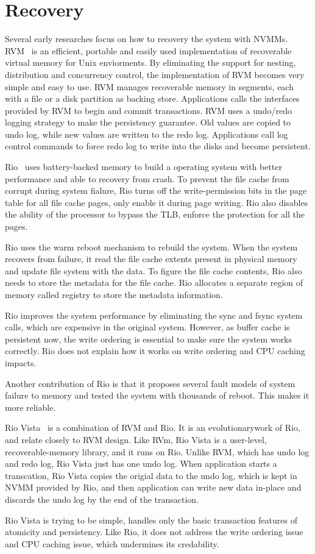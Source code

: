 \section{Recovery} 
\label{sec:recovery}

Several early researches focus on how to recovery the system with NVMMs.
RVM~\cite{RVM} is an efficient, portable and easily used implementation of
recoverable virtual memory for Unix enviorments. By eliminating the support
for nesting, distribution and concurrency control, the implementation of 
RVM becomes very simple and easy to use. RVM manages recoverable memory in
segments, each with a file or a disk partition as backing store. Applications
calls the interfaces provided by RVM to begin and commit transactions. RVM
uses a undo/redo logging strategy to make the persistency guarantee. Old values
are copied to undo log, while new values are written to the redo log. Applications call log control commands to force redo log to write into the disks
and become persistent.

Rio~\cite{riofilecache} uses battery-backed memory to build a operating system
with better performance and able to recovery from crash. To prevent the file
cache from corrupt during system fialure, Rio turns off the write-permission
bits in the page table for all file cache pages, only enable it during page
writing. Rio also disables the ability of the processor to bypass the TLB,
enforce the protection for all the pages.

Rio uses the warm reboot mechanism to rebuild the system. When the system 
recovers from failure, it read the file cache extents present in physical memory
and update file system with the data. To figure the file cache contents,
Rio also needs to store the metadata for the file cache. Rio allocates a
separate region of memory called registry to store the metadata information.

Rio improves the system performance by eliminating the sync and fsync system
calls, which are expensive in the original system. However, as buffer cache
is persistent now, the write ordering is essential to make sure the system
works correctly. Rio does not explain how it works on write ordering and CPU
caching impacts.

Another contribution of Rio is that it proposes several fault models of system
failure to memory and tested the system with thousands of reboot. This makes
it more reliable.
 
Rio Vista~\cite{riovista} is a combination of RVM and Rio. It is an evolutionarywork of Rio, and relate closely to RVM design. Like RVm, Rio Vista is a
user-level, recoverable-memory library, and it runs on Rio. Unlike RVM,
which has undo log and redo log, Rio Vista just has one undo log. When
application starts a transcation, Rio Vista copies the origial data to the 
undo log, which is kept in NVMM provided by Rio, and then application can
write new data in-place and discards the undo log by the end of the transaction.

Rio Vista is trying to be simple, handles only the basic transaction features
of atomicity and persistency. Like Rio, it does not address the write ordering
issue and CPU caching issue, which undermines its credability. 


